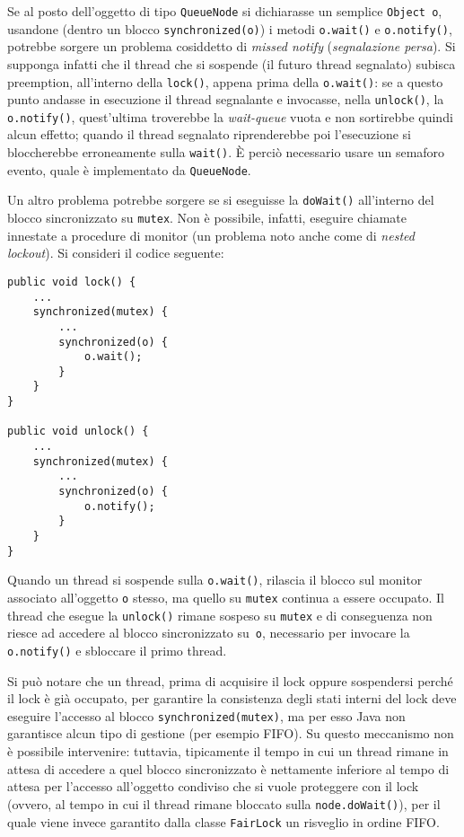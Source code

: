 \documentclass[a4paper,twoside]{article}
\newcommand\code{\lstinline[basicstyle=\normalsize\ttfamily]}
\begin{document}
Se al posto dell'oggetto di tipo \code|QueueNode| si dichiarasse un semplice \code|Object o|, usandone (dentro un blocco \texttt{synchronized(o)}) i metodi \code|o.wait()| e \code|o.notify()|, potrebbe sorgere un problema cosiddetto di \emph{missed notify} (\emph{segnalazione persa}). Si supponga infatti che il thread che si sospende (il futuro thread segnalato) subisca preemption, all'interno della \code|lock()|, appena prima della \code|o.wait()|: se a questo punto andasse in esecuzione il thread segnalante e invocasse, nella \code|unlock()|, la \code|o.notify()|, quest'ultima troverebbe la \emph{wait-queue} vuota e non sortirebbe quindi alcun effetto; quando il thread segnalato riprenderebbe poi l'esecuzione si bloccherebbe erroneamente sulla \code|wait()|. È perciò necessario usare un semaforo evento, quale è implementato da \code|QueueNode|.

Un altro problema potrebbe sorgere se si eseguisse la \code|doWait()| all'interno del blocco sincronizzato su \code|mutex|. Non è possibile, infatti, eseguire chiamate innestate a procedure di monitor (un problema noto anche come di \emph{nested lockout}). Si consideri il codice seguente:

\begin{lstlisting}
public void lock() {
    ...
    synchronized(mutex) {
        ...
        synchronized(o) {
            o.wait();
        }
    }
}

public void unlock() {
    ...
    synchronized(mutex) {
        ...
        synchronized(o) {
            o.notify();
        }
    }
}
\end{lstlisting}
%
Quando un thread si sospende sulla \code|o.wait()|, rilascia il blocco sul monitor associato all'oggetto \code|o| stesso, ma quello su \code|mutex| continua a essere occupato. Il thread che esegue la \code|unlock()| rimane sospeso su \code|mutex| e di conseguenza non riesce ad accedere al blocco sincronizzato su~\code|o|, necessario per invocare la \code|o.notify()| e sbloccare il primo thread.

Si può notare che un thread, prima di acquisire il lock oppure sospendersi perché il lock è già occupato, per garantire la consistenza degli stati interni del lock deve eseguire l'accesso al blocco \code|synchronized(mutex)|, ma per esso Java non garantisce alcun tipo di gestione (per esempio FIFO). Su questo meccanismo non è possibile intervenire: tuttavia, tipicamente il tempo in cui un thread rimane in attesa di accedere a quel blocco sincronizzato è nettamente inferiore al tempo di attesa per l'accesso all'oggetto condiviso che si vuole proteggere con il lock (ovvero, al tempo in cui il thread rimane bloccato sulla \code|node.doWait()|), per il quale viene invece garantito dalla classe \code|FairLock| un risveglio in ordine FIFO.
\end{document}
